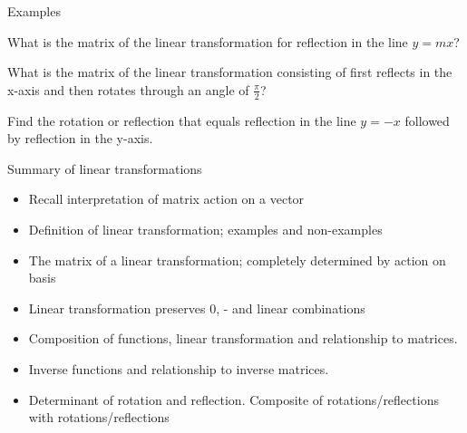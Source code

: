 \documentclass{beamer}
\begin{document}
\begin{frame}{Examples}
\begin{example}
What is the matrix of the linear transformation for reflection in the line $y = mx$?
\end{example}
\begin{example}
What is the matrix of the linear transformation consisting of first reflects in the x-axis and then rotates through an angle of $\frac{\pi}{2}$?
\end{example}
\begin{example}
Find the rotation or reflection that equals reflection in the line $y = -x$ followed by reflection in the y-axis.
\end{example}
\end{frame}

\begin{frame}{Summary of linear transformations}
\begin{itemize}
	\item Recall interpretation of matrix action on a vector
	\item Definition of linear transformation; examples and non-examples
	\item The matrix of a linear transformation; completely determined by action on basis
	\item Linear transformation preserves 0, - and linear combinations
	\item Composition of functions, linear transformation and relationship to matrices.
	\item Inverse functions and relationship to inverse matrices.
	\item Determinant of rotation and reflection. Composite of rotations/reflections with rotations/reflections
\end{itemize}
\end{frame}
\end{document}
